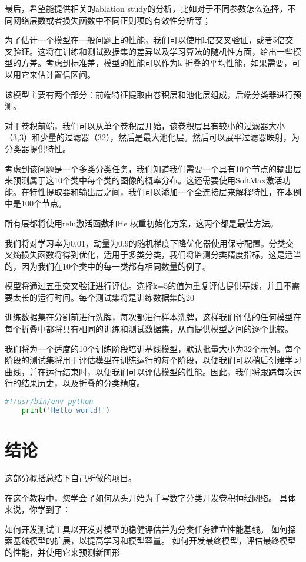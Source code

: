 \documentclass[12pt]{article}
\begin{document}
    最后，希望能提供相关的ablation study的分析，比如对于不同参数怎么选择，不同网络层数或者损失函数中不同正则项的有效性分析等；
    
    为了估计一个模型在一般问题上的性能，我们可以使用k倍交叉验证，或者5倍交叉验证。这将在训练和测试数据集的差异以及学习算法的随机性方面，给出一些模型的方差。考虑到标准差，模型的性能可以作为k-折叠的平均性能，如果需要，可以用它来估计置信区间。
    
    该模型主要有两个部分：前端特征提取由卷积层和池化层组成，后端分类器进行预测。
    
    对于卷积前端，我们可以从单个卷积层开始，该卷积层具有较小的过滤器大小（3,3）和少量的过滤器（32），然后是最大池化层。然后可以展平过滤器映射，为分类器提供特性。
    
    考虑到该问题是一个多类分类任务，我们知道我们需要一个具有10个节点的输出层来预测属于这10个类中每个类的图像的概率分布。这还需要使用SoftMax激活功能。在特性提取器和输出层之间，我们可以添加一个全连接层来解释特性，在本例中是100个节点。
    
    所有层都将使用relu激活函数和He 权重初始化方案，这两个都是最佳方法。
    
    我们将对学习率为0.01，动量为0.9的随机梯度下降优化器使用保守配置。分类交叉熵损失函数将得到优化，适用于多类分类，我们将监测分类精度指标，这是适当的，因为我们在10个类中的每一类都有相同数量的例子。
    
    模型将通过五重交叉验证进行评估。选择k=5的值为重复评估提供基线，并且不需要太长的运行时间。每个测试集将是训练数据集的20%
    
    训练数据集在分割前进行洗牌，每次都进行样本洗牌，这样我们评估的任何模型在每个折叠中都将具有相同的训练和测试数据集，从而提供模型之间的逐个比较。
    
    我们将为一个适度的10个训练阶段培训基线模型，默认批量大小为32个示例。每个阶段的测试集将用于评估模型在训练运行的每个阶段，以便我们可以稍后创建学习曲线，并在运行结束时，以便我们可以评估模型的性能。因此，我们将跟踪每次运行的结果历史，以及折叠的分类精度。
    
    \begin{lstlisting}[language=python] 
    #!/usr/bin/env python
    print('Hello world!')
    \end{lstlisting}

    \section{结论}
    这部分概括总结下自己所做的项目。
    
    在这个教程中，您学会了如何从头开始为手写数字分类开发卷积神经网络。
    具体来说，你学到了：
    
    如何开发测试工具以开发对模型的稳健评估并为分类任务建立性能基线。
    如何探索基线模型的扩展，以提高学习和模型容量。
    如何开发最终模型，评估最终模型的性能，并使用它来预测新图形
    
    \newpage
    
\end{document}
